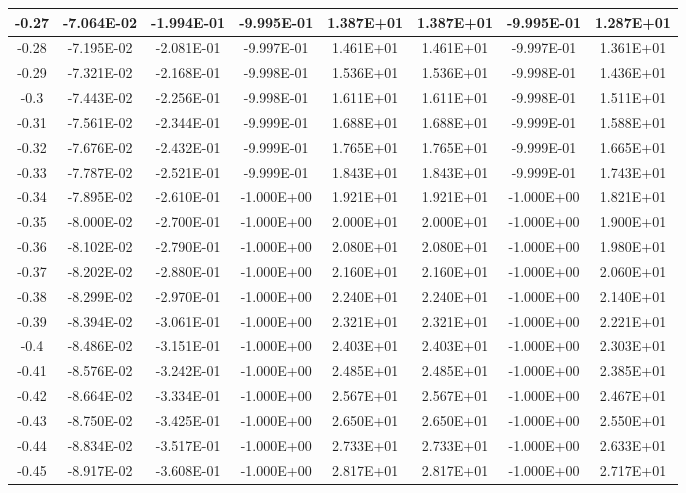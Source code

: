 \documentclass{article}
\begin{document}
\begin{center}
\begin{longtable}{|c|c|c|c|c|c|c|c|}
-0.27 & -7.064E-02 & -1.994E-01 & -9.995E-01 & 1.387E+01 & 1.387E+01 & -9.995E-01 & 1.287E+01 \\ \hline
-0.28 & -7.195E-02 & -2.081E-01 & -9.997E-01 & 1.461E+01 & 1.461E+01 & -9.997E-01 & 1.361E+01 \\ \hline
-0.29 & -7.321E-02 & -2.168E-01 & -9.998E-01 & 1.536E+01 & 1.536E+01 & -9.998E-01 & 1.436E+01 \\ \hline
-0.3 & -7.443E-02 & -2.256E-01 & -9.998E-01 & 1.611E+01 & 1.611E+01 & -9.998E-01 & 1.511E+01 \\ \hline
-0.31 & -7.561E-02 & -2.344E-01 & -9.999E-01 & 1.688E+01 & 1.688E+01 & -9.999E-01 & 1.588E+01 \\ \hline
-0.32 & -7.676E-02 & -2.432E-01 & -9.999E-01 & 1.765E+01 & 1.765E+01 & -9.999E-01 & 1.665E+01 \\ \hline
-0.33 & -7.787E-02 & -2.521E-01 & -9.999E-01 & 1.843E+01 & 1.843E+01 & -9.999E-01 & 1.743E+01 \\ \hline
-0.34 & -7.895E-02 & -2.610E-01 & -1.000E+00 & 1.921E+01 & 1.921E+01 & -1.000E+00 & 1.821E+01 \\ \hline
-0.35 & -8.000E-02 & -2.700E-01 & -1.000E+00 & 2.000E+01 & 2.000E+01 & -1.000E+00 & 1.900E+01 \\ \hline
-0.36 & -8.102E-02 & -2.790E-01 & -1.000E+00 & 2.080E+01 & 2.080E+01 & -1.000E+00 & 1.980E+01 \\ \hline
-0.37 & -8.202E-02 & -2.880E-01 & -1.000E+00 & 2.160E+01 & 2.160E+01 & -1.000E+00 & 2.060E+01 \\ \hline
-0.38 & -8.299E-02 & -2.970E-01 & -1.000E+00 & 2.240E+01 & 2.240E+01 & -1.000E+00 & 2.140E+01 \\ \hline
-0.39 & -8.394E-02 & -3.061E-01 & -1.000E+00 & 2.321E+01 & 2.321E+01 & -1.000E+00 & 2.221E+01 \\ \hline
-0.4 & -8.486E-02 & -3.151E-01 & -1.000E+00 & 2.403E+01 & 2.403E+01 & -1.000E+00 & 2.303E+01 \\ \hline
-0.41 & -8.576E-02 & -3.242E-01 & -1.000E+00 & 2.485E+01 & 2.485E+01 & -1.000E+00 & 2.385E+01 \\ \hline
-0.42 & -8.664E-02 & -3.334E-01 & -1.000E+00 & 2.567E+01 & 2.567E+01 & -1.000E+00 & 2.467E+01 \\ \hline
-0.43 & -8.750E-02 & -3.425E-01 & -1.000E+00 & 2.650E+01 & 2.650E+01 & -1.000E+00 & 2.550E+01 \\ \hline
-0.44 & -8.834E-02 & -3.517E-01 & -1.000E+00 & 2.733E+01 & 2.733E+01 & -1.000E+00 & 2.633E+01 \\ \hline
-0.45 & -8.917E-02 & -3.608E-01 & -1.000E+00 & 2.817E+01 & 2.817E+01 & -1.000E+00 & 2.717E+01 \\ \hline

\end{longtable}
\end{center}
\end{document}
